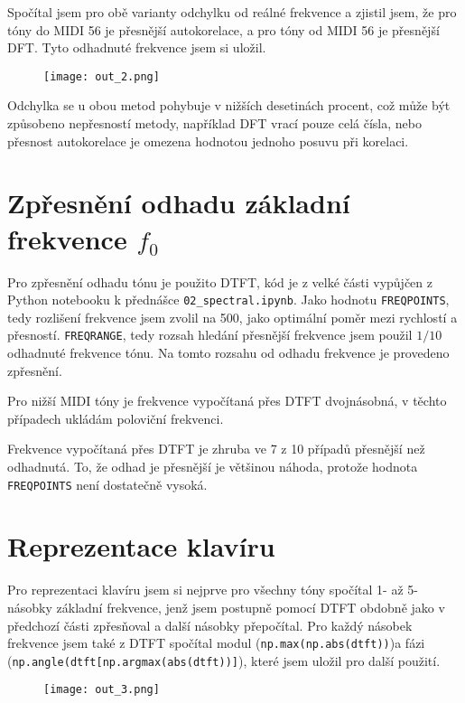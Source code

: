 \documentclass[11pt,a4paper]{article}
\begin{document}
Spočítal jsem pro obě varianty odchylku od reálné frekvence a zjistil jsem, že pro tóny do MIDI 56 je přesnější autokorelace, a pro tóny od MIDI 56 je přesnější DFT. Tyto odhadnuté frekvence jsem si uložil.

\begin{figure}[H]
    \begin{center}
        \texttt{[image: out\_2.png]}
    \end{center}
\end{figure}

Odchylka se u obou metod pohybuje v nižších desetinách procent, což může být způsobeno nepřesností metody, například DFT vrací pouze celá čísla, nebo přesnost autokorelace je omezena hodnotou jednoho posuvu při korelaci.

\section{Zpřesnění odhadu základní frekvence $f_0$}

Pro zpřesnění odhadu tónu je použito DTFT, kód je z velké části vypůjčen z Python notebooku k přednášce \verb|02_spectral.ipynb|. Jako hodnotu \verb|FREQPOINTS|, tedy rozlišení frekvence jsem zvolil na 500, jako optimální poměr mezi rychlostí a přesností. \verb|FREQRANGE|, tedy rozsah hledání přesnější frekvence jsem použil $1/10$ odhadnuté frekvence tónu. Na tomto rozsahu od odhadu frekvence je provedeno zpřesnění.

Pro nižší MIDI tóny je frekvence vypočítaná přes DTFT dvojnásobná, v těchto případech ukládám poloviční frekvenci.

Frekvence vypočítaná přes DTFT je zhruba ve 7 z 10 případů přesnější než odhadnutá. To, že odhad je přesnější je většinou náhoda, protože hodnota \verb|FREQPOINTS| není dostatečně vysoká.

\section{Reprezentace klavíru}

Pro reprezentaci klavíru jsem si nejprve pro všechny tóny spočítal 1- až 5-násobky základní frekvence, jenž jsem postupně pomocí DTFT obdobně jako v předchozí části zpřesňoval a další násobky přepočítal. Pro každý násobek frekvence jsem také z DTFT spočítal modul (\verb|np.max(np.abs(dtft))|)a fázi (\verb|np.angle(dtft[np.argmax(abs(dtft))]|), které jsem uložil pro další použití.

\begin{figure}[H]
    \begin{center}
        \texttt{[image: out\_3.png]}
    \end{center}
\end{figure}
\end{document}
